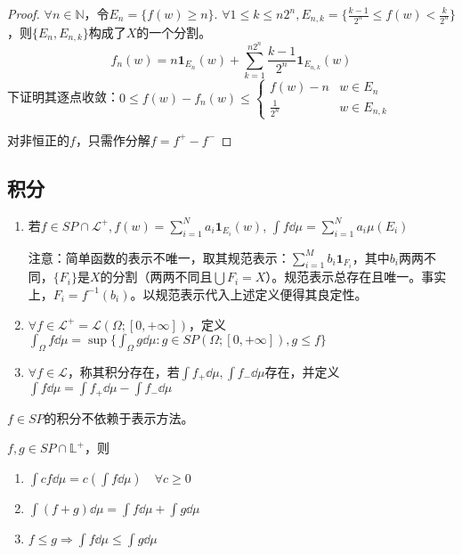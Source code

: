 \documentclass{ctexart}
\begin{document}
\begin{proof}
  $\forall n\in\mathbb{N}$，令$E_{n}=\{f(w)\geq n\}$. $\forall 1\leq k\leq n2^{n}, E_{n,k}=\{\frac{k-1}{2^{n}}\leq f(w)<\frac{k}{2^{n}}\}$，则$\{E_{n},E_{n,k}\}$构成了$X$的一个分割。
  \[f_{n}(w)=n\bm 1_{E_{n}}(w)+\sum_{k=1}^{n2^{n}}\frac{k-1}{2^{n}}\bm{1}_{E_{n,k}}(w)\]
下证明其逐点收敛：$0\leq f(w)-f_{n}(w)\leq
\begin{cases}
  f(w)-n&w\in E_{n}\\ \frac{1}{2^{n}}&w\in E_{n,k}
\end{cases}
$

对非恒正的$f$，只需作分解$f=f^{+}-f^{-}$
\end{proof}

\subsection{积分}
\begin{Def}
  \begin{enumerate}
  \item 若$f\in SP\cap\mathcal{L}^{+},f(w)=\sum_{i=1}^{N}a_{i}\bm{1}_{E_{i}}(w)$, $\int f\dd\mu=\sum_{i=1}^{N}a_{i}\mu(E_{i})$

    注意：简单函数的表示不唯一，取其规范表示：$\sum_{i=1}^{M}b_{i}\bm{1}_{F_{i}}$，其中$b_{i}$两两不同，$\{F_{i}\}$是$X$的分割（两两不同且$\bigcup F_{i}=X$）。规范表示总存在且唯一。事实上，$F_{i}=f^{-1}(b_{i})$。以规范表示代入上述定义便得其良定性。

  \item $\forall f\in\mathcal{L}^{+}=\mathcal{L}(\Omega;[0,+\infty])$，定义$\int_{\Omega}f\dd\mu=\sup\{\int_{\Omega} g\dd \mu:g\in SP(\Omega;[0,+\infty]),g\leq f\}$
  \item $\forall f\in\mathcal{L}$，称其积分存在，若$\int f_{+}\dd\mu,\int f_{-}\dd\mu$存在，并定义$\int f\dd\mu=\int f_{+}\dd\mu-\int f_{-}\dd\mu$
  \end{enumerate}
\end{Def}


\begin{Prop}
  $f\in SP$的积分不依赖于表示方法。
\end{Prop}

\begin{Prop}
  $f,g\in SP\cap \mathbb{L}^{+}$，则
  \begin{enumerate}
  \item $\int cf\dd\mu=c(\int f\dd\mu)\quad\forall c\geq 0$
  \item $\int(f+g)\dd \mu=\int f\dd\mu+\int g\dd\mu$
  \item $f\leq g\Rightarrow \int f\dd\mu\leq\int g\dd\mu$
  \end{enumerate}
\end{Prop}
\end{document}
